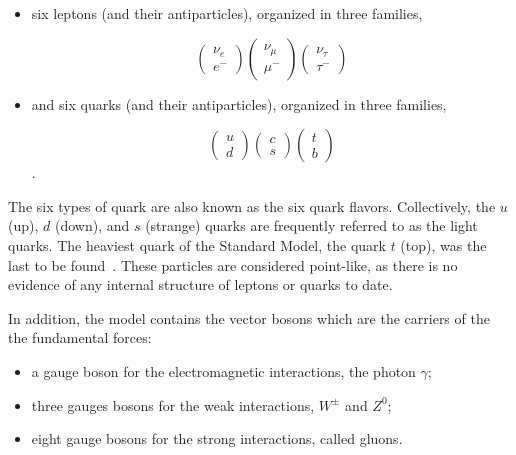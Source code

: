 \begin{itemize}\addtolength{\itemsep}{-0.4\baselineskip}
\item
six leptons (and their antiparticles), organized in three families, 

\[ \left( \begin{array}{c} \nu_e \\ e^- \end{array} \right)  \left( \begin{array}{c} \nu_{\mu} \\ \mu^- \end{array} \right)   \left( \begin{array}{c} \nu_{\tau} \\ \tau^- \end{array} \right)     \]


\item
and six quarks (and their antiparticles), organized in three families,

\[ \left( \begin{array}{c} u \\ d \end{array} \right)  \left( \begin{array}{c} c \\ s \end{array} \right)   \left( \begin{array}{c} t \\ b \end{array} \right)     \].

\end{itemize}

The six types of quark are also known as the six quark flavors. Collectively, the $u$ (up), $d$ (down), and $s$ (strange) quarks are frequently referred to as the light quarks. The heaviest quark of the Standard Model, the quark $t$ (top), was the last to be found~\cite{PhysRevLett.74.2626,PhysRevLett.74.2422}. These particles are considered point-like, as there is no evidence of any internal structure of leptons or quarks to date.

In addition, the model contains the vector bosons which are the carriers of the the fundamental forces:

\begin{itemize}\addtolength{\itemsep}{-0.4\baselineskip}
\item
a gauge boson for the electromagnetic interactions, the photon $\gamma$; 
\item
three gauges bosons for the weak interactions, $W^{\pm}$ and $Z^0$;
\item
eight gauge bosons for the strong interactions, called gluons. 
\end{itemize}


